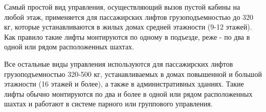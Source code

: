 	Самый простой вид управления, осуществляющий вызов пустой кабины на любой этаж,
		применяется для пассажирских лифтов грузоподъемностью до 320 кг,
		которые устанавливаются в жилых домах средней этажности (9-12 этажей).
		Как правило такие лифты монтируются по одному в подъезде, реже - по два в одной или рядом расположенных шахтах. 

	Все остальные виды управления используются для пассажирских лифтов грузоподъемностью 320-500 кг,
		устанавливаемых в домах повышенной и большой этажности (16 этажей и более),
		а также в административных зданиях. Такие лифты обычно монтируются по два и более в одной
		или рядом расположенных шахтах и работают в системе парного или группового управления.
